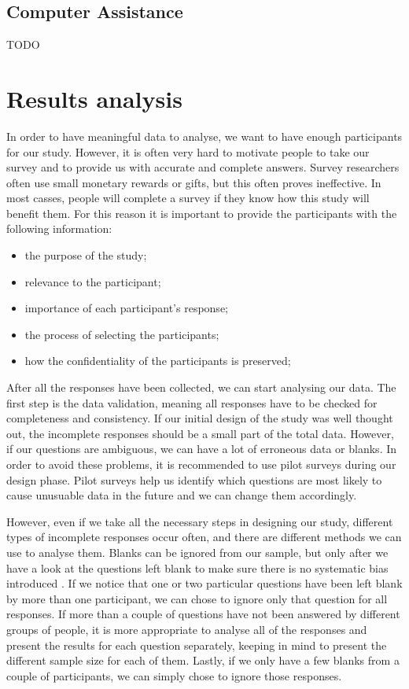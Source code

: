 \documentclass{report}
\begin{document}
\section{Computer Assistance}

TODO

\chapter{Results analysis}
In order to have meaningful data to analyse, we want to have enough participants for our study. However, it is often very hard to motivate people to take our survey and to provide us with accurate and complete answers. Survey researchers often use small monetary rewards or gifts, but this often proves ineffective. In most casses, people will complete a survey if they know how this study will benefit them. For this reason it is important to provide the participants with the following information\cite{Kitchenham4}:
\begin{itemize}
\item the purpose of the study;\\
\item relevance to the participant;\\
\item importance of each participant's response;\\
\item the process of selecting the participants;\\
\item how the confidentiality of the participants is preserved;\\
\end{itemize}

After all the responses have been collected, we can start analysing our data. The first step is the data validation, meaning all responses have to be checked for completeness and consistency. If our initial design of the study was well thought out, the incomplete responses should be a small part of the total data. However, if our questions are ambiguous, we can have a lot of erroneous data or blanks. In order to avoid these problems, it is recommended to use pilot surveys during our design phase. Pilot surveys help us identify which questions are most likely to cause unusuable data in the future and we can change them accordingly. 

However, even if we take all the necessary steps in designing our study, different types of incomplete responses occur often, and there are different methods we can use to analyse them. Blanks can be ignored from our sample, but only after we have a look at the questions left blank to make sure there is no systematic bias introduced \cite{Kitchenham6}. If we notice that one or two particular questions have been left blank by more than one participant, we can chose to ignore only that question for all responses. If more than a couple of questions have not been answered by different groups of people, it is more appropriate to analyse all of the responses and present the results for each question separately, keeping in mind to present the different sample size for each of them. Lastly, if we only have a few blanks from a couple of participants, we can simply chose to ignore those responses.
\end{document}
